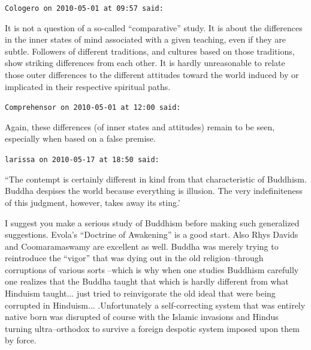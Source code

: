 \begin{footnotesize}
\begin{sffamily}
\hfill

\texttt{Cologero on 2010-05-01 at 09:57 said:}

It is not a question of a so-called ``comparative'' study. It is about the differences in the inner states of mind associated with a given teaching, even if they are subtle. Followers of different traditions, and cultures based on those traditions, show striking differences from each other. It is hardly unreasonable to relate those outer differences to the different attitudes toward the world induced by or implicated in their respective spiritual paths.

\hfill

\texttt{Comprehensor on 2010-05-01 at 12:00 said:}

Again, these differences (of inner states and attitudes) remain to be seen, especially when based on a false premise.

\hfill

\texttt{larissa on 2010-05-17 at 18:50 said:}

``The contempt is certainly different in kind from that characteristic of Buddhism. Buddha despises the world because everything is illusion. The very indefiniteness of this judgment, however, takes away its sting.'

I suggest you make a serious study of Buddhism before making such generalized suggestions. Evola's ``Doctrine of Awakening'' is a good start. Also Rhys Davids and Coomaramaswamy are excellent as well. Buddha was merely trying to reintroduce the ``vigor'' that was dying out in the old religion--through corruptions of various sorts --which is why when one studies Buddhism carefully one realizes that the Buddha taught that which is hardly different from what Hinduism taught... just tried to reinvigorate the old ideal that were being corrupted in Hinduism... .Unfortunately a self-correcting system that was entirely native born was disrupted of course with the Islamic invasions and Hindus turning ultra--orthodox to survive a foreign despotic system imposed upon them by force.

\end{sffamily}
\end{footnotesize}

